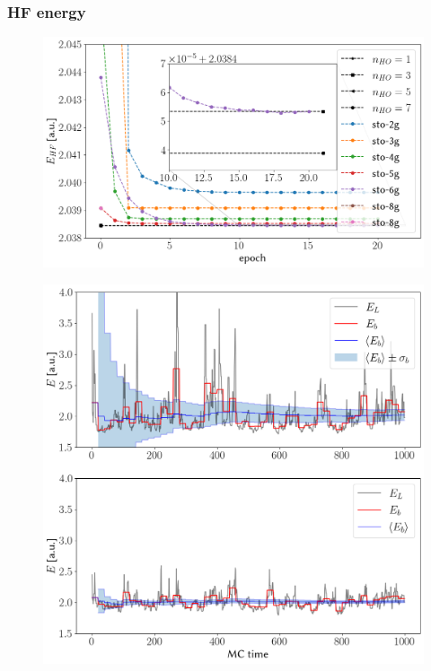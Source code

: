 \documentclass[final,3p,times,twocolumn]{elsarticle}
\begin{document}
	\subsubsection{HF energy}
	\begin{figure}[h]
		\centering
		\includegraphics[width=\linewidth]{../plots/HF_optimization}
		\caption{}
		\label{fig:hfoptimization}
	\end{figure}
	\begin{figure}[h]
		\centering
		\includegraphics[width=\linewidth]{../plots/blocking.png}
		\caption{}
		\label{fig:blocking+jast}
	\end{figure}
\end{document}
